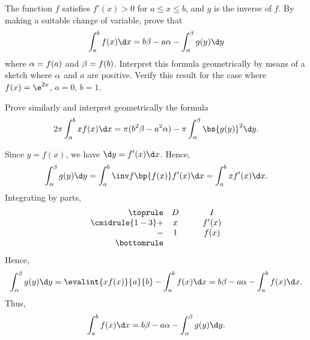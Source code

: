 \begin{problem}
    The function $f$ satisfies $f'(x) > 0$ for $a \leq x \leq b$, and $g$ is the inverse of $f$. By making a suitable change of variable, prove that \[\int_a^b f(x) \d x = b\b - a\a - \int_\a^\b g(y) \d y\] where $\alpha = f(a)$ and $\beta = f(b)$. Interpret this formula geometrically by means of a sketch where $\alpha$ and $a$ are positive. Verify this result for the case where $f(x) = \e^{2x}$, $a = 0$, $b = 1$.

    Prove similarly and interpret geometrically the formula \[2\pi \int_a^b xf(x) \d x = \pi(b^2\b - a^2\a) - \pi\int_\a^\b \bs{g(y)}^2 \d y.\]
\end{problem}
\begin{solution}
    Since $y = f(x)$, we have $\d y = f'(x) \d x$. Hence, \[\int_\a^\b g(y) \d y = \int_a^b \inv f\bp{f(x)} f'(x) \d x = \int_a^b xf'(x) \d x.\] Integrating by parts,
    \[\begin{array}{r c @{\hspace*{1.0cm}} c}\toprule
        & D & I \\\cmidrule{1-3}
        + & x & f'(x) \\
        - & 1 & f(x) \\\bottomrule
    \end{array}\] Hence, \[\int_\a^\b g(y) \d y = \evalint{xf(x)}{a}{b} - \int_a^b f(x) \d x = b\b - a\a - \int_a^b f(x) \d x.\] Thus, \[\int_a^b f(x) \d x = b\b - a\a - \int_\a^\b g(y) \d y.\]

    \begin{center}
\end{center}
\end{solution}
